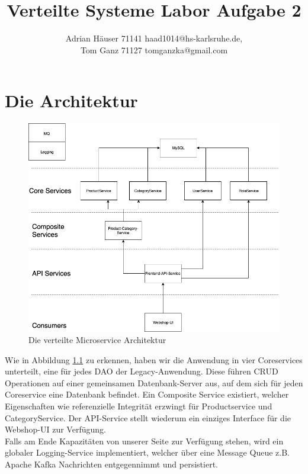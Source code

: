 \documentclass[
               letterpaper,%
               10pt,%
               oneside,%
               onecolumn,%
               final,%
               openany%
              ]{report}
\title{Verteilte Systeme Labor Aufgabe 2}
\author{Adrian Häuser 71141 haad1014@hs-karlsruhe.de,\\ Tom Ganz 71127 tomganzka@gmail.com}
\begin{document}
\maketitle


\tableofcontents %

\chapter{Die Architektur}

\begin{figure}[h!]
\includegraphics[scale=0.4]{api}
\caption{Die verteilte Microservice Architektur}
\label{fig:arch}
\centering
\end{figure}
Wie in Abbildung \ref{fig:arch} zu erkennen, haben wir die Anwendung in vier Coreservices unterteilt, eine für jedes DAO der Legacy-Anwendung. Diese führen CRUD Operationen auf einer gemeinsamen Datenbank-Server aus, auf dem sich für jeden Coreservice eine Datenbank befindet. Ein Composite Service existiert, welcher Eigenschaften wie referenzielle Integrität erzwingt für Productservice und CategoryService. Der API-Service stellt wiederum ein einziges Interface für die Webshop-UI zur Verfügung.\\
Falls am Ende Kapazitäten von unserer Seite zur Verfügung stehen, wird ein globaler Logging-Service implementiert, welcher über eine Message Queue z.B. Apache Kafka Nachrichten entgegennimmt und persistiert.
\end{document}
